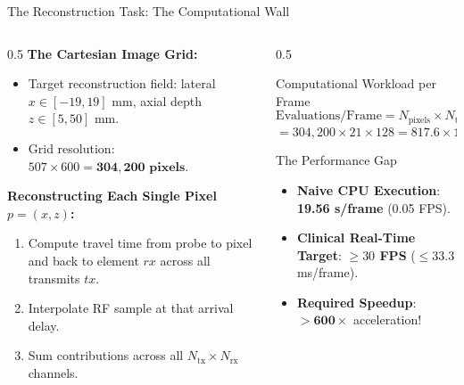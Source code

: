 \documentclass[aspectratio=169,10pt]{beamer}
\begin{document}
\begin{frame}{The Reconstruction Task: The Computational Wall}
  \begin{columns}[T]
    \begin{column}{0.5\textwidth}
      \textbf{The Cartesian Image Grid:}
      \begin{itemize}
        \item Target reconstruction field: lateral $x \in [-19, 19]$ mm, axial depth $z \in [5, 50]$ mm.
        \item Grid resolution: $507 \times 600 = \mathbf{304,200\text{ pixels}}$.
      \end{itemize}
      \vspace{0.2cm}
      \textbf{Reconstructing Each Single Pixel $p = (x, z)$:}
      \begin{enumerate}
        \item Compute travel time from probe to pixel and back to element $rx$ across all transmits $tx$.
        \item Interpolate RF sample at that arrival delay.
        \item Sum contributions across all $N_{\text{tx}} \times N_{\text{rx}}$ channels.
      \end{enumerate}
    \end{column}
    \begin{column}{0.5\textwidth}
      \begin{block}{Computational Workload per Frame}
        $$\text{Evaluations/Frame} = N_{\text{pixels}} \times N_{\text{tx}} \times N_{\text{rx}}$$
        $$= 304,200 \times 21 \times 128 = \mathbf{817.6\times 10^6\text{ operations}}$$
      \end{block}
      \begin{alertblock}{The Performance Gap}
        \begin{itemize}
          \item \textbf{Naive CPU Execution}: \textbf{19.56 s/frame} (0.05 FPS).
          \item \textbf{Clinical Real-Time Target}: \textbf{$\ge 30$ FPS} ($\le 33.3$ ms/frame).
          \item \textbf{Required Speedup}: $\mathbf{> 600\times}$ acceleration!
        \end{itemize}
      \end{alertblock}
    \end{column}
  \end{columns}
\end{frame}
\end{document}
